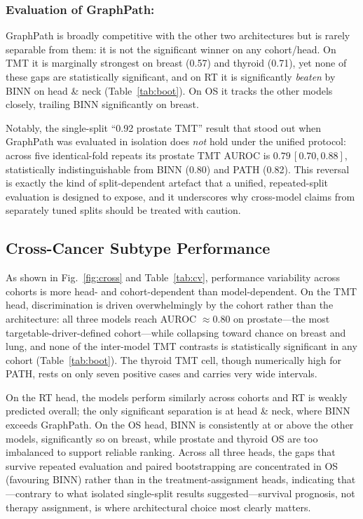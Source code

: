 \documentclass[sigconf]{acmart}
\begin{document}
\subsubsection{Evaluation of GraphPath:}

GraphPath is broadly competitive with the other two architectures but is
rarely separable from them: it is not the significant winner on any
cohort/head. On TMT it is marginally strongest on breast (0.57) and thyroid
(0.71), yet none of these gaps are statistically significant, and on RT it
is significantly \emph{beaten} by BINN on head \& neck (Table~\ref{tab:boot}).
On OS it tracks the other models closely, trailing BINN significantly on
breast.

Notably, the single-split ``0.92 prostate TMT'' result that stood out when
GraphPath was evaluated in isolation does \emph{not} hold under the unified
protocol: across five identical-fold repeats its prostate TMT AUROC is
$0.79\,[0.70,0.88]$, statistically indistinguishable from BINN (0.80) and
PATH (0.82). This reversal is exactly the kind of split-dependent artefact
that a unified, repeated-split evaluation is designed to expose, and it
underscores why cross-model claims from separately tuned splits should be
treated with caution.

\subsection{Cross-Cancer Subtype Performance}

As shown in Fig.~\ref{fig:cross} and Table~\ref{tab:cv}, performance
variability across cohorts is more head- and cohort-dependent than
model-dependent. On the TMT head, discrimination is driven overwhelmingly
by the cohort rather than the architecture: all three models reach
AUROC $\approx0.80$ on prostate---the most targetable-driver-defined
cohort---while collapsing toward chance on breast and lung, and none of the
inter-model TMT contrasts is statistically significant in any cohort
(Table~\ref{tab:boot}). The thyroid TMT cell, though numerically high for
PATH, rests on only seven positive cases and carries very wide intervals.

On the RT head, the models perform similarly across cohorts and RT is weakly
predicted overall; the only significant separation is at head \& neck, where
BINN exceeds GraphPath. On the OS head, BINN is consistently at or above the
other models, significantly so on breast, while prostate and thyroid OS are
too imbalanced to support reliable ranking. Across all three heads, the
gaps that survive repeated evaluation and paired bootstrapping are
concentrated in OS (favouring BINN) rather than in the treatment-assignment
heads, indicating that---contrary to what isolated single-split results
suggested---survival prognosis, not therapy assignment, is where
architectural choice most clearly matters.
\end{document}
